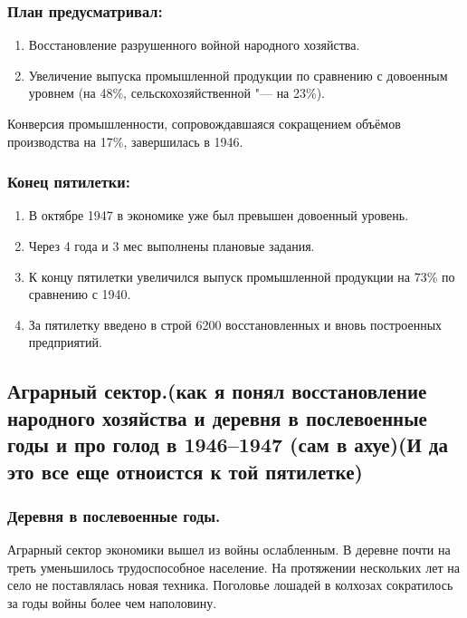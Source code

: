 \subsubsection{\textbf{План предусматривал:}}

\begin{enumerate}
    \item Восстановление разрушенного войной народного хозяйства.
    \item Увеличение выпуска промышленной продукции по сравнению с довоенным уровнем (на 48\%, сельскохозяйственной "--- на 23\%). 
\end{enumerate}

Конверсия промышленности, сопровождавшаяся сокращением объёмов производства на 17\%, завершилась в 1946.

\subsubsection{\textbf{Конец пятилетки:}}

\begin{enumerate}
    \item В октябре 1947 в экономике уже был превышен довоенный уровень.
    \item Через 4 года и 3 мес выполнены плановые задания.
    \item К концу пятилетки увеличился выпуск промышленной продукции на 73\% по сравнению с 1940.
    \item За пятилетку введено в строй 6200 восстановленных и вновь построенных предприятий.
\end{enumerate}

\subsection{Аграрный сектор.(как я понял восстановление народного хозяйства и деревня в послевоенные годы и про голод в 1946--1947 (сам в ахуе)(И да это все еще отноистся к той пятилетке)}

\subsubsection{\textbf{Деревня в послевоенные годы.}}

Аграрный сектор экономики вышел из войны ослабленным. В деревне почти на треть уменьшилось трудоспособное население. На протяжении нескольких лет на село не поставлялась новая техника. Поголовье лошадей в колхозах сократилось за годы войны более чем наполовину. 

